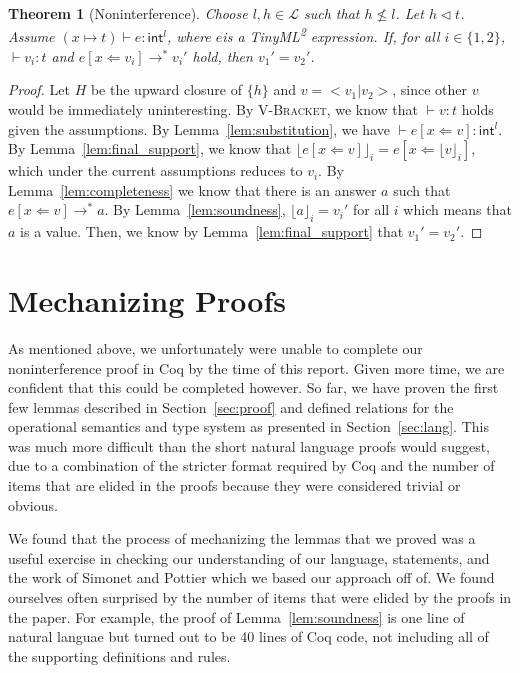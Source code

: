 \documentclass[a4paper,twocolumn]{article}
\newcommand{\langName}[0]{TinyML\textsuperscript{2}}
\newcommand{\typeRule}[3]{#1 \vdash #2 \colon #3}
\newcommand{\guards}[0]{\lhd}
\newcommand{\lift}[1]{\lfloor #1 \rfloor}
\theoremstyle{plain}
\newtheorem{thm}{Theorem}
\theoremstyle{definition}
\begin{document}
\begin{thm}[Noninterference]
  Choose $l, h \in \mathcal{L}$ such that $h \not\leq l$.  Let $h \guards t$.
  Assume $\typeRule{(x \mapsto t)}{e}{\textsf{int}^l}$, where $e$is a \langName
  expression.  If, for all $i \in \{1, 2\}$, $\typeRule{ }{v_i}{t}$ and $e[x
  \Leftarrow v_i] \to^* v_i'$ hold, then $v_1' = v_2'$.
\end{thm}
\begin{proof}
  Let $H$ be the upward closure of $\{h\}$ and $v = < v_1 | v_2 >$, since other
  $v$ would be immediately uninteresting.  By \textsc{V-Bracket}, we know that
  $\typeRule{ }{v}{t}$ holds given the assumptions.
  By Lemma~\ref{lem:substitution}, we have $\typeRule{ }{e[x \Leftarrow
  v]}{\textsf{int}^l}$.  By Lemma~\ref{lem:final_support}, we know that
  $\lift{e[x \Leftarrow v]}_i = e[x \Leftarrow \lift{v}_i]$, which under the
  current assumptions reduces to $v_i$.  By Lemma~\ref{lem:completeness} we know
  that there is an answer $a$ such that $e[x \Leftarrow v] \to^* a$.  By
  Lemma~\ref{lem:soundness}, $\lift{a}_i = v_i'$ for all $i$ which means that
  $a$ is a value.  Then, we know by Lemma~\ref{lem:final_support} that $v_1' =
  v_2'$.
\end{proof}

\section{Mechanizing Proofs}
\label{sec:mechanizing}

As mentioned above, we unfortunately were unable to complete our noninterference
proof in Coq by the time of this report.  Given more time, we are confident that
this could be completed however.  So far, we have proven the first few lemmas
described in Section~\ref{sec:proof} and defined relations for the operational
semantics and type system as presented in Section~\ref{sec:lang}.  This was much
more difficult than the short natural language proofs would suggest, due to a
combination of the stricter format required by Coq and the number of items that
are elided in the proofs because they were considered trivial or obvious.

We found that the process of mechanizing the lemmas that we proved was a useful
exercise in checking our understanding of our language, statements, and the work
of Simonet and Pottier which we based our approach off of.  We found ourselves
often surprised by the number of items that were elided by the proofs in the
paper.  For example, the proof of Lemma~\ref{lem:soundness} is one line of
natural languae but turned out to be 40 lines of Coq code, not including all of
the supporting definitions and rules.
\end{document}
